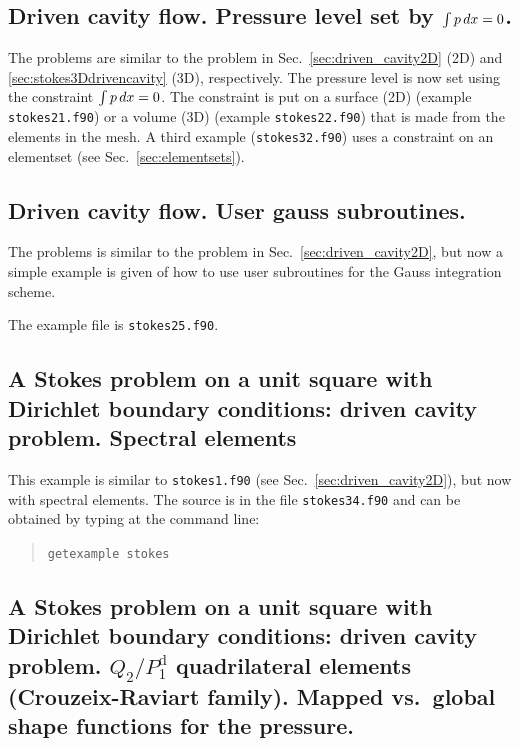 \subsection{Driven cavity flow. Pressure level set by $\int p\,d x=0$.}
\label{sec:driven_cavity_intpzero}

The problems are similar to the problem in Sec.~\ref{sec:driven_cavity2D} (2D)
and \ref{sec:stokes3Ddrivencavity} (3D), respectively. The
pressure level is now set using the constraint $\int p\,d x=0$. The
constraint is put on a surface (2D) (example \texttt{stokes21.f90}) or
a volume (3D) (example \texttt{stokes22.f90}) that is made from
the elements in the mesh. A third example (\texttt{stokes32.f90}) uses a
constraint on an elementset (see Sec.~\ref{sec:elementsets}).

\subsection{Driven cavity flow. User gauss subroutines.}
\label{sec:driven_cavity_usergauss}

The problems is similar to the problem in Sec.~\ref{sec:driven_cavity2D}, but now a
simple example is given of how to use user subroutines for the Gauss integration scheme.

The example file is \texttt{stokes25.f90}.

\subsection{A Stokes problem on a unit square with Dirichlet boundary 
            conditions: driven cavity problem. Spectral elements}
\label{sec:stokes34}

This example is similar to \texttt{stokes1.f90} (see
Sec.~\ref{sec:driven_cavity2D}), but now with spectral elements.
The source is in the file \texttt{stokes34.f90}
and can be obtained by typing at the
command line:
\begin{quote}
   \texttt{getexample stokes}
\end{quote}

\subsection{A Stokes problem on a unit square with Dirichlet boundary 
            conditions: driven cavity problem. $Q_2/P_1^\mathrm{d}$ quadrilateral elements (Crouzeix-Raviart family).
            Mapped vs.\ global shape functions for the pressure.}
\label{sec:stokes47}

